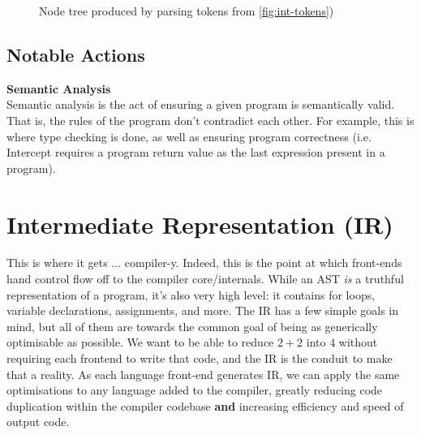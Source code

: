 \documentclass[12pt]{article}
\begin{document}
\begin{figure}[h]
  \centering
  \caption{Node tree produced by parsing tokens from \autoref{fig:int-tokens})}
  \label{fig:int-tree}
\end{figure}
\FloatBarrier

\subsection{Notable Actions}
\label{subsec:node-tree:notable-actions}

\noindent\textbf{Semantic Analysis}\\
Semantic analysis is the act of ensuring a given program is semantically valid. That is, the rules of the program don't contradict each other. For example, this is where type checking is done, as well as ensuring program correctness (i.e. Intercept requires a program return value as the last expression present in a program).

\section{Intermediate Representation (IR)}
\label{sec:ir}

This is where it gets ... compiler-y. Indeed, this is the point at which front-ends hand control flow off to the compiler core/internals. While an AST \emph{is} a truthful representation of a program, it's also very high level: it contains for loops, variable declarations, assignments, and more. The IR has a few simple goals in mind, but all of them are towards the common goal of being as generically optimisable as possible. We want to be able to reduce $2 + 2$ into $4$ without requiring each frontend to write that code, and the IR is the conduit to make that a reality. As each language front-end generates IR, we can apply the same optimisations to any language added to the compiler, greatly reducing code duplication within the compiler codebase \textbf{and} increasing efficiency and speed of output code.
\end{document}
